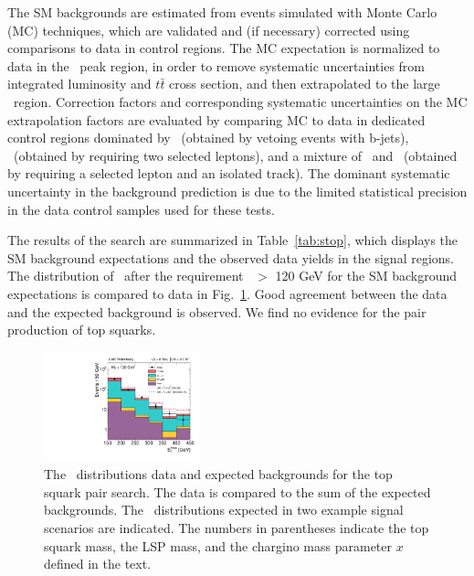 The SM backgrounds are estimated from events simulated with Monte Carlo (MC) techniques, which are validated and 
(if necessary) corrected using comparisons to data in control regions. The MC expectation is normalized to data in the \mt\ peak region,
in order to remove systematic uncertainties from integrated luminosity and $t\bar{t}$ cross section, and then extrapolated to the 
large \mt\ region. Correction factors and corresponding systematic uncertainties on the MC extrapolation factors are evaluated by 
comparing MC to data in dedicated control regions dominated by \wjets\ (obtained by vetoing events with b-jets), \ttll\ 
(obtained by requiring two selected leptons), and a mixture of \ttll\ and \ttljets\ (obtained by requiring a selected lepton and 
an isolated track). The dominant systematic uncertainty in the background prediction is due to the limited statistical precision in
the data control samples used for these tests.




The results of the search are summarized in Table~\ref{tab:stop}, which displays the SM background expectations and the observed data yields
in the signal regions. The distribution of \met\ after the requirement \mt\ $>$ 120 GeV for the SM background expectations is compared to
data in Fig.~\ref{fig:stop}. Good agreement between the data and the expected background is observed. We find no evidence
for the pair production of top squarks.

\begin{figure}
\centering
\includegraphics[width=0.4\textwidth]{HCPPlots/stopmet.pdf}
\caption{The \met\ distributions data and expected backgrounds for the top squark pair search. The data is compared to the sum of the 
expected backgrounds. The \met\ distributions expected in two example signal scenarios are indicated. The numbers in parentheses
indicate the top squark mass, the LSP mass, and the chargino mass parameter $x$ defined in the text.}
\label{fig:stop}       %
\end{figure}

